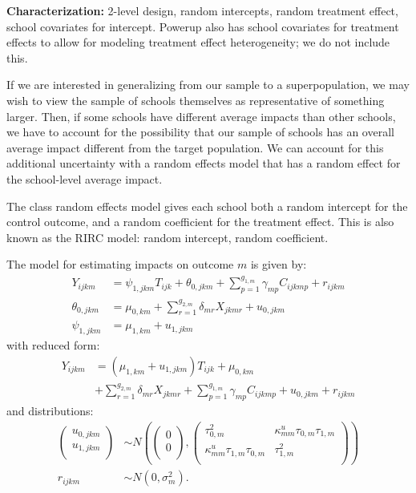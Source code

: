 \documentclass[12pt]{article}
\begin{document}
\textbf{Characterization:} 2-level design, random intercepts, random treatment effect, school covariates for intercept. Powerup also has school covariates for treatment effects to allow for modeling treatment effect heterogeneity; we do not include this.

If we are interested in generalizing from our sample to a superpopulation, we may wish to view the sample of schools themselves as representative of something larger.
Then, if some schools have different average impacts than other schools, we have to account for the possibility that our sample of schools has an overall average impact different from the target population.
We can account for this additional uncertainty with a random effects model that has a random effect for the school-level average impact.

The class random effects model gives each school both a random intercept for the control outcome, and  a random coefficient for the treatment effect.
This is also known as the RIRC model: random intercept, random coefficient.

The model for estimating impacts on outcome $m$ is given by:
\begin{align}
Y_{ijkm} &= \psi_{1,jkm} T_{ijk} + \theta_{0,jkm} + \sum_{p=1}^{g_{1,m}} \gamma_{mp} C_{ijkmp} + r_{ijkm}\\
\nonumber \theta_{0,jkm} &= \mu_{0,km} + \sum_{r=1}^{g_{2,m}} \delta_{mr} X_{jkmr} + u_{0,jkm}\\
\nonumber \psi_{1,jkm} &= \mu_{1,km} + u_{1,jkm}
\end{align}
with reduced form:
\begin{align}
Y_{ijkm} &= \left(\mu_{1,km} + u_{1,jkm}\right) T_{ijk} + \mu_{0,km} \\
\nonumber & + \sum_{r=1}^{g_{2,m}} \delta_{mr} X_{jkmr} + \sum_{p=1}^{g_{1,m}} \gamma_{mp} C_{ijkmp} + u_{0,jkm} + r_{ijkm}
\end{align}
and distributions:
\begin{align}
\begin{pmatrix} u_{0, jkm} \\ u_{1,jkm}\\ \end{pmatrix} &\sim
N\left(\begin{pmatrix} 0 \\ 0\\ \end{pmatrix}, \begin{pmatrix} \tau^2_{0,m} & \kappa^u_{mm} \tau_{0,m} \tau_{1,m} \\ \kappa^u_{mm} \tau_{1,m} \tau_{0,m} & \tau^2_{1,m} \\ \end{pmatrix}\right) \\
\nonumber r_{ijkm} &\sim N\left(0, \sigma^2_m\right).
\end{align}
\end{document}
